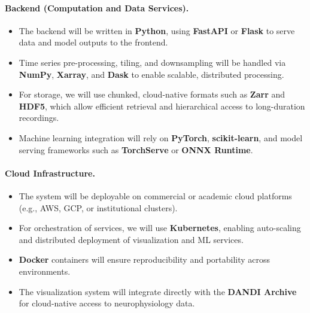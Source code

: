 \paragraph{Backend (Computation and Data Services).}
\begin{itemize}
          \item The backend will be written in \textbf{Python}, using
              \textbf{FastAPI} or \textbf{Flask} to serve data and model
              outputs to the frontend.
                \item Time series pre-processing, tiling, and downsampling will
                    be handled via \textbf{NumPy}, \textbf{Xarray}, and
                    \textbf{Dask} to enable scalable, distributed processing.
                      \item For storage, we will use chunked, cloud-native
                          formats such as \textbf{Zarr} and \textbf{HDF5},
                          which allow efficient retrieval and hierarchical
                          access to long-duration recordings.
                            \item Machine learning integration will rely on
                                \textbf{PyTorch}, \textbf{scikit-learn}, and
                                model serving frameworks such as
                                \textbf{TorchServe} or \textbf{ONNX Runtime}.
\end{itemize}

\paragraph{Cloud Infrastructure.}
\begin{itemize}
          \item The system will be deployable on commercial or academic cloud
              platforms (e.g., AWS, GCP, or institutional clusters).
                \item For orchestration of services, we will use
                    \textbf{Kubernetes}, enabling auto-scaling and distributed
                    deployment of visualization and ML services.
                      \item \textbf{Docker} containers will ensure
                          reproducibility and portability across environments.
                            \item The visualization system will integrate
                                directly with the \textbf{DANDI Archive} for
                                cloud-native access to neurophysiology data.
\end{itemize}

